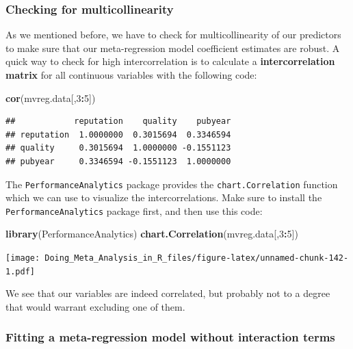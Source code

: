 \documentclass[]{book}
\newenvironment{Shaded}{\begin{snugshade}}{\end{snugshade}}
\newcommand{\DecValTok}[1]{\textcolor[rgb]{0.00,0.00,0.81}{#1}}
\newcommand{\KeywordTok}[1]{\textcolor[rgb]{0.13,0.29,0.53}{\textbf{#1}}}
\newcommand{\NormalTok}[1]{#1}
\newcommand{\OperatorTok}[1]{\textcolor[rgb]{0.81,0.36,0.00}{\textbf{#1}}}
\begin{document}
\hypertarget{checking-for-multicollinearity}{%
\subsubsection{Checking for multicollinearity}\label{checking-for-multicollinearity}}

As we mentioned before, we have to check for multicollinearity of our predictors to make sure that our meta-regression model coefficient estimates are robust. A quick way to check for high intercorrelation is to calculate a \textbf{intercorrelation matrix} for all continuous variables with the following code:

\begin{Shaded}
\begin{Highlighting}[]
\KeywordTok{cor}\NormalTok{(mvreg.data[,}\DecValTok{3}\OperatorTok{:}\DecValTok{5}\NormalTok{])}
\end{Highlighting}
\end{Shaded}

\begin{verbatim}
##            reputation    quality    pubyear
## reputation  1.0000000  0.3015694  0.3346594
## quality     0.3015694  1.0000000 -0.1551123
## pubyear     0.3346594 -0.1551123  1.0000000
\end{verbatim}

The \texttt{PerformanceAnalytics} package provides the \texttt{chart.Correlation} function which we can use to visualize the intercorrelations. Make sure to install the \texttt{PerformanceAnalytics} package first, and then use this code:

\begin{Shaded}
\begin{Highlighting}[]
\KeywordTok{library}\NormalTok{(PerformanceAnalytics)}
\KeywordTok{chart.Correlation}\NormalTok{(mvreg.data[,}\DecValTok{3}\OperatorTok{:}\DecValTok{5}\NormalTok{])}
\end{Highlighting}
\end{Shaded}

\texttt{[image: Doing\_Meta\_Analysis\_in\_R\_files/figure-latex/unnamed-chunk-142-1.pdf]}

We see that our variables are indeed correlated, but probably not to a degree that would warrant excluding one of them.

\hypertarget{fitting-a-meta-regression-model-without-interaction-terms}{%
\subsubsection{Fitting a meta-regression model without interaction terms}\label{fitting-a-meta-regression-model-without-interaction-terms}}
\end{document}
